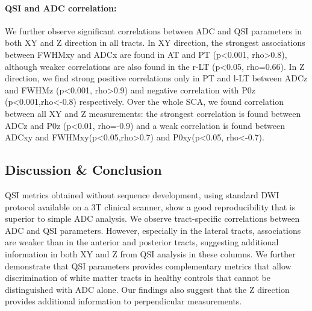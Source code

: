\paragraph{QSI and ADC correlation:} We further observe significant correlations between ADC and QSI parameters in both XY and Z direction in all tracts.  In XY direction, the strongest associations between FWHMxy and ADCx are found in AT and PT (p<0.001, rho>0.8), although weaker correlations are also found in the r-LT (p<0.05, rho=0.66). In Z direction, we find strong positive correlations only in PT and l-LT between ADCz and FWHMz (p<0.001, rho>0.9) and negative correlation with P0z (p<0.001,rho<-0.8) respectively. Over the whole SCA, we found correlation between all XY and Z measurements: the strongest correlation is found between ADCz and P0z (p<0.01, rho=-0.9) and a weak correlation is found between ADCxy and FWHMxy(p<0.05,rho>0.7) and P0xy(p<0.05, rho<-0.7).
\subsection*{Discussion \& Conclusion}
QSI metrics obtained without sequence development, using standard DWI protocol available on a 3T clinical scanner, show a good reproducibility that is superior to simple ADC analysis.  We observe tract-specific correlations between ADC and QSI parameters. However, especially in the lateral tracts, associations are weaker than in the anterior and posterior tracts, suggesting additional information in both XY and Z from QSI analysis in these columns. We further demonstrate that QSI parameters provides complementary metrics that allow discrimination of white matter tracts in healthy controls that cannot be distinguished with ADC alone. Our findings also suggest that the Z direction provides additional information to perpendicular measurements.


